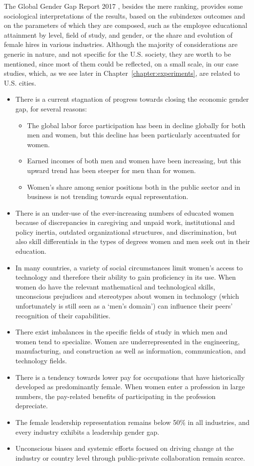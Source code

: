 The Global Gender Gap Report 2017 \cite{schwab2017global}, besides the mere ranking, provides some sociological interpretations of the results, based on the subindexes outcomes and on the parameters of which they are composed, such as the employee educational attainment by level, field of study, and gender, or the share and evolution of female hires in various industries. Although the majority of considerations are generic in nature, and not specific for the U.S. society, they are worth to be mentioned, since most of them could be reflected, on a small scale, in our case studies, which, as we see later in Chapter~\ref{chapter:experiments}, are related to U.S. cities.
\begin{itemize}
\item There is a current stagnation of progress towards closing the economic gender gap, for several reasons:
\begin{itemize}
\item The global labor force participation has been in decline globally for both men and women, but this decline has been particularly accentuated for women.
\item Earned incomes of both men and women have been increasing, but this upward trend has been steeper for men than for women.
\item Women's share among senior positions both in the public sector and in business is not trending towards equal representation.
\end{itemize}
\item There is an under-use of the ever-increasing numbers of educated women because of discrepancies in caregiving and unpaid work, institutional and policy inertia, outdated organizational structures, and discrimination, but also skill differentials in the types of degrees women and men seek out in their education.
\item In many countries, a variety of social circumstances limit women's access to technology and therefore their ability to gain proficiency in its use. When women do have the relevant mathematical and technological skills, unconscious prejudices and stereotypes about women in technology (which unfortunately is still seen as a `men's domain') can influence their peers' recognition of their capabilities.
\item There exist imbalances in the specific fields of study in which men and women tend to specialize. Women are underrepresented in the engineering, manufacturing, and construction as well as information, communication, and technology fields.
\item There is a tendency towards lower pay for occupations that have historically developed as predominantly female. When women enter a profession in large numbers, the pay-related benefits of participating in the profession depreciate.
\item The female leadership representation remains below 50\% in all industries, and every industry exhibits a leadership gender gap.
\item Unconscious biases and systemic efforts focused on driving change at the industry or country level through public-private collaboration remain scarce.
\end{itemize}

